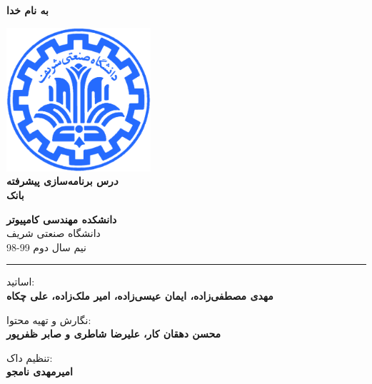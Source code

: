\documentclass[]{article}
\begin{document}
\begin{titlepage}
\begin{center}

\textbf{ \Huge{به نام خدا} }
        
\vspace{0.2cm}

\includegraphics[width=0.4\textwidth]{sharif1.png}\\
\vspace{0.2cm}
\textbf{ \Huge{\emph درس برنامه‌سازی پیشرفته} }\\
\vspace{0.25cm}
\textbf{ \Large{بانک} }
\vspace{0.2cm}
       
 
      \large \textbf{دانشکده مهندسی کامپیوتر}\\\vspace{0.1cm}
    \large   دانشگاه صنعتی شریف\\\vspace{0.2cm}
       \large   ﻧﯿﻢ سال دوم 99-98 \\\vspace{0.10cm}
      \noindent\rule[1ex]{\linewidth}{1pt}
اساتید:\\
    \textbf{{مهدی مصطفی‌زاده، ایمان عیسی‌زاده، امیر ملک‌زاده، علی چکاه}}



        \vspace{0.10cm}
نگارش و تهیه محتوا:\\
    \textbf{{محسن دهقان کار، علیرضا شاطری و صابر ظفرپور}}
    
       \vspace{0.10cm}
       تنظیم داک:\\
    \textbf{{امیرمهدی نامجو}}

    
        \vspace{0.05cm}
    

\end{center}
\end{titlepage}
\end{document}
